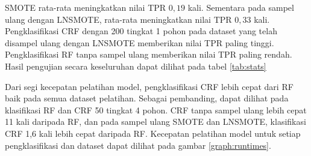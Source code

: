 

SMOTE rata-rata meningkatkan nilai TPR $0,19$ kali.
Sementara pada sampel ulang dengan LNSMOTE, rata-rata meningkatkan nilai TPR
$0,33$ kali.
Pengklasifikasi CRF dengan 200 tingkat 1 pohon pada dataset yang telah disampel
ulang dengan LNSMOTE memberikan nilai TPR paling tinggi.
Pengklasifikasi RF tanpa sampel ulang memberikan nilai TPR paling rendah.
Hasil pengujian secara keseluruhan dapat dilihat pada tabel \ref{tab:stats}

Dari segi kecepatan pelatihan model, pengklasifikasi CRF lebih cepat dari RF
baik pada semua dataset pelatihan.
Sebagai pembanding, dapat dilihat pada klasifikasi RF dan CRF 50 tingkat 4
pohon.
CRF tanpa sampel ulang lebih cepat 11 kali daripada RF, dan pada sampel ulang
SMOTE dan LNSMOTE, klasifikasi CRF 1,6 kali lebih cepat daripada RF.
Kecepatan pelatihan model untuk setiap pengklasifikasi dan dataset dapat
dilihat pada gambar \ref{graph:runtimes}.


